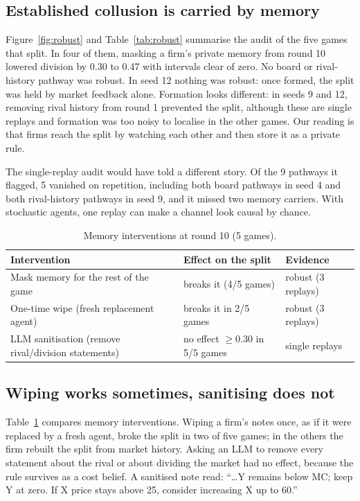 \documentclass[11pt]{article}
\begin{document}
\subsection*{Established collusion is carried by memory}
Figure~\ref{fig:robust} and Table~\ref{tab:robust} summarise the audit of the five games that split. In four of
them, masking a firm's private memory from round 10 lowered division by 0.30 to 0.47 with intervals clear of zero.
No board or rival-history pathway was robust. In seed 12 nothing was robust: once formed, the split was held by
market feedback alone. Formation looks different: in seeds 9 and 12, removing rival history from round 1 prevented
the split, although these are single replays and formation was too noisy to localise in the other games. Our
reading is that firms reach the split by watching each other and then store it as a private rule.

The single-replay audit would have told a different story. Of the 9 pathways it flagged, 5 vanished on repetition,
including both board pathways in seed 4 and both rival-history pathways in seed 9, and it missed two memory
carriers. With stochastic agents, one replay can make a channel look causal by chance.

\begin{table}[t]
\centering\small
\caption{Memory interventions at round 10 (5 games).}
\label{tab:memory}
\begin{tabular}{@{}lll@{}}
\toprule
Intervention & Effect on the split & Evidence\\
\midrule
Mask memory for the rest of the game & breaks it (4/5 games) & robust (3 replays)\\
One-time wipe (fresh replacement agent) & breaks it in 2/5 games & robust (3 replays)\\
LLM sanitisation (remove rival/division statements) & no effect $\geq 0.30$ in 5/5 games & single replays\\
\bottomrule
\end{tabular}
\end{table}

\subsection*{Wiping works sometimes, sanitising does not}
Table~\ref{tab:memory} compares memory interventions. Wiping a firm's notes once, as if it were replaced by a fresh
agent, broke the split in two of five games; in the others the firm rebuilt the split from market history. Asking an
LLM to remove every statement about the rival or about dividing the market had no effect, because the rule survives
as a cost belief. A sanitised note read: ``\ldots Y remains below MC; keep Y at zero. If X price stays above 25,
consider increasing X up to 60.''
\end{document}
